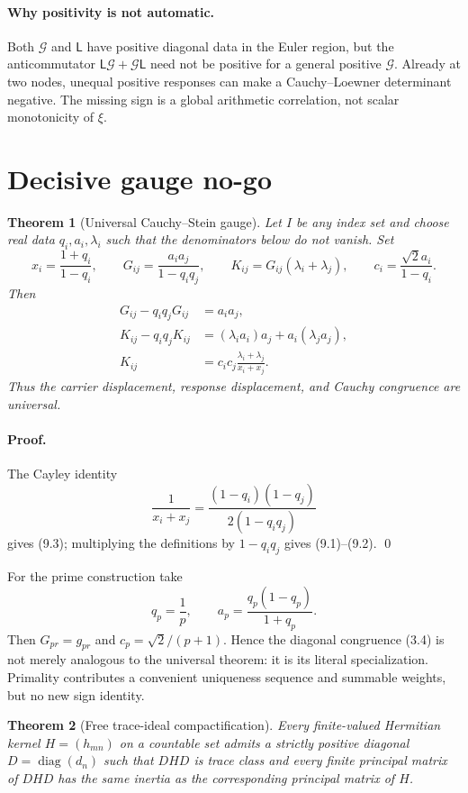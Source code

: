 \documentclass[11pt]{article}
\newtheorem{theorem}{Theorem}[section]
\theoremstyle{definition}
\theoremstyle{remark}
\newcommand{\cG}{\mathcal G}
\newcommand{\diag}{\operatorname{diag}}
\begin{document}
\paragraph{Why positivity is not automatic.}
Both $\cG$ and $\mathsf L$ have positive diagonal data in the Euler region, but the
anticommutator $\mathsf L\cG+\cG\mathsf L$ need not be positive for a general positive $\cG$.
Already at two nodes, unequal positive responses can make a Cauchy--Loewner determinant negative.
The missing sign is a global arithmetic correlation, not scalar monotonicity of $\xi$.

\section{Decisive gauge no-go}
\label{sec:nogo}

\begin{theorem}[Universal Cauchy--Stein gauge]
\label{thm:universal-gauge}
Let $I$ be any index set and choose real data $q_i,a_i,\lambda_i$ such that the denominators below
do not vanish.  Set
\[
 x_i=\frac{1+q_i}{1-q_i},\qquad
 G_{ij}=\frac{a_i a_j}{1-q_iq_j},\qquad
 K_{ij}=G_{ij}(\lambda_i+\lambda_j),\qquad
 c_i=\frac{\sqrt2a_i}{1-q_i}.
\]
Then
\begin{align}
 G_{ij}-q_iq_jG_{ij}&=a_ia_j, \tag{9.1}\\
 K_{ij}-q_iq_jK_{ij}
   &=(\lambda_i a_i)a_j+a_i(\lambda_j a_j), \tag{9.2}\\
 K_{ij}&=c_i c_j\frac{\lambda_i+\lambda_j}{x_i+x_j}. \tag{9.3}
\end{align}
Thus the carrier displacement, response displacement, and Cauchy congruence are universal.
\end{theorem}

\paragraph{Proof.}
The Cayley identity
\[
 \frac1{x_i+x_j}
 =\frac{(1-q_i)(1-q_j)}{2(1-q_iq_j)}
\]
gives (9.3); multiplying the definitions by $1-q_iq_j$ gives (9.1)--(9.2). \qed

For the prime construction take
\[
 q_p=\frac1p,\qquad
 a_p=\frac{q_p(1-q_p)}{1+q_p}.
\]
Then $G_{pr}=g_{pr}$ and $c_p=\sqrt2/(p+1)$.  Hence the diagonal congruence (3.4) is not merely analogous to the
universal theorem: it is its literal specialization.  Primality contributes a convenient
uniqueness sequence and summable weights, but no new sign identity.

\begin{theorem}[Free trace-ideal compactification]
\label{thm:free-gauge}
Every finite-valued Hermitian kernel $H=(h_{mn})$ on a countable set admits a strictly positive
diagonal $D=\diag(d_n)$ such that $DHD$ is trace class and every finite principal matrix of
$DHD$ has the same inertia as the corresponding principal matrix of $H$.
\end{theorem}
\end{document}
